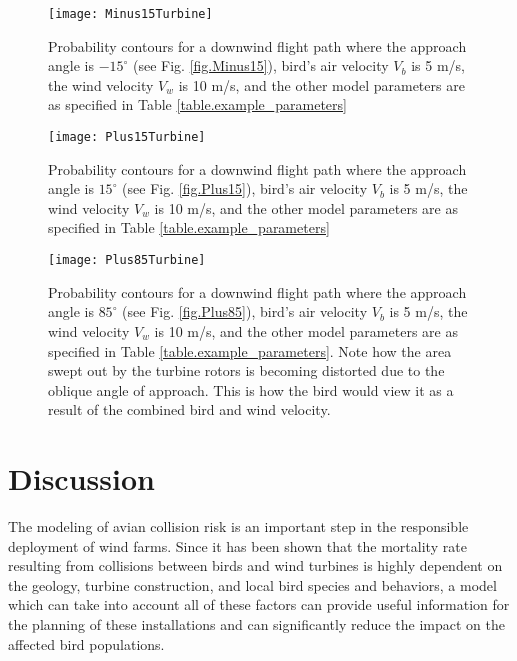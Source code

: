 \documentclass[10pt,conference]{IEEEtran}
\begin{document}
\begin{figure}
   \centering
   \texttt{[image: Minus15Turbine]}
   \caption{Probability contours for a downwind flight path where the approach angle is $-15^\circ$ (see Fig. \ref{fig.Minus15}), bird's air velocity $V_b$ is 5
m/s, the wind velocity $V_w$ is 10 m/s, and the other model parameters are as specified in Table
\ref{table.example_parameters}}
   \label{fig.Minus15Turbine}
   \end{figure}

\begin{figure}
   \centering
   \texttt{[image: Plus15Turbine]}
   \caption{Probability contours for a downwind flight path where the approach angle is $15^\circ$ (see Fig. \ref{fig.Plus15}), bird's air velocity $V_b$ is 5
m/s, the wind velocity $V_w$ is 10 m/s, and the other model parameters are as specified in Table
\ref{table.example_parameters}}
   \label{fig.Plus15Turbine}
   \end{figure}

\begin{figure}
   \centering
   \texttt{[image: Plus85Turbine]}
   \caption{Probability contours for a downwind flight path where the approach angle is $85^\circ$ (see Fig. \ref{fig.Plus85}), bird's air velocity $V_b$ is 5
m/s, the wind velocity $V_w$ is 10 m/s, and the other model parameters are as specified in Table
\ref{table.example_parameters}. Note how the area swept out by the turbine rotors is becoming distorted due to the
oblique angle of approach. This is how the bird would view it as a result of the combined bird and wind velocity.}
   \label{fig.Plus85Turbine}
   \end{figure}



\section{Discussion}
The modeling of avian collision risk is an important step in the responsible deployment of wind farms. Since it has
been shown that the mortality rate resulting from collisions between birds and wind turbines is highly dependent on the
geology, turbine construction, and local bird species and behaviors, a model which can take into account all of these
factors can provide useful information for the planning of these installations and can significantly reduce the impact
on the affected bird populations.
\end{document}
